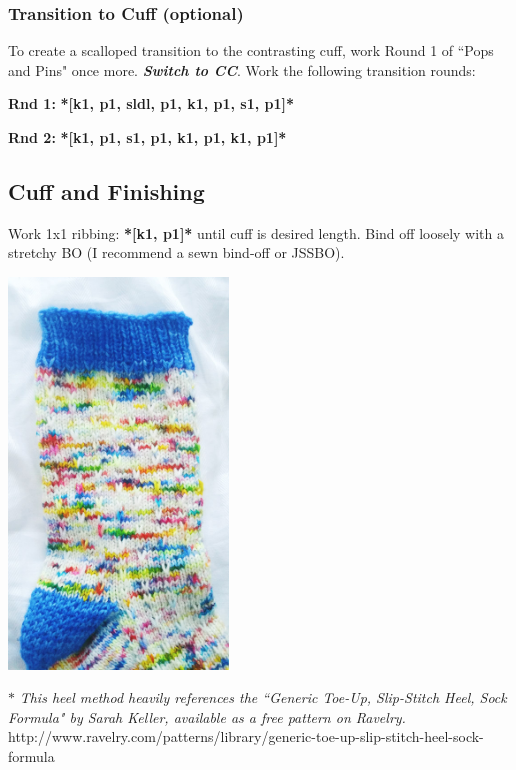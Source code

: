 \documentclass[12pt]{article}
\newcommand{\vocab}[1]{\emph{\textbf{#1}}} %
\newcommand{\rowDir}[1]{\textbf{#1:}} %
\renewcommand{\repeat}[1]{\textbf{*[#1]*}} %
\newenvironment{unframed}
    {%
	\begin{addmargin}[2em]{0pt}
	\setlength{\parindent}{-2em}}
    {\vspace{1em}
	\setlength{\parindent}{0em}
	\end{addmargin}}
\begin{document}
\begin{multicols}{2}
\subsubsection*{Transition to Cuff (optional)} 
\vspace{-.5em}
To create a scalloped transition to the contrasting cuff, work Round 1 of ``Pops and Pins" once more. \vocab{Switch to CC}. Work the following transition rounds:
\small
\begin{unframed}
\hspace{-2em}\rowDir{Rnd 1} \repeat{k1, p1, sldl, p1, k1, p1, s1, p1}

\rowDir{Rnd 2} \repeat{k1, p1, s1, p1, k1, p1, k1, p1}
\end{unframed}
\normalsize
\vspace{-1em}

\subsection*{Cuff and Finishing}

Work 1x1 ribbing: \repeat{k1, p1} until cuff is desired length. Bind off loosely with a stretchy BO (I recommend a sewn bind-off or JSSBO).

\vfill

\includegraphics[width=2.3in]{detail.jpg}

\vfill

\small
$*$ \emph{This heel method heavily references the ``Generic Toe-Up, Slip-Stitch Heel, Sock Formula" by Sarah Keller, available as a free pattern on Ravelry.} \\  http://www.ravelry.com/patterns/library/generic-toe-up-slip-stitch-heel-sock-formula
\end{multicols}
\end{document}
